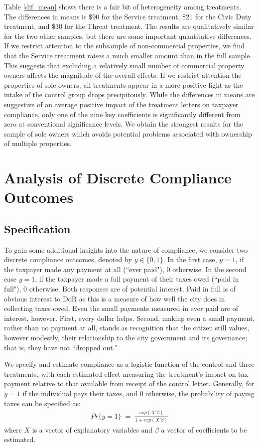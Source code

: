 \documentclass[12pt,titlepage]{article}
\begin{document}
Table \ref{dif_mean} shows there is a fair bit of heterogeneity among treatments. The differences in means 
is \$90 for the Service treatment, \$21 for the Civic Duty treatment, and \$30 for the 
Threat treatment. The results are qualitatively similar for the two other samples, but
there are some important quantitative differences. If we restrict attention to the subsample of
non-commercial properties, we find that the Service treatment raises a
much smaller amount than in the full sample. This suggests that excluding a relatively small number of 
commercial property owners affects the magnitude of the overall effects.  If we restrict
attention the properties of sole owners, all treatments appear in a
more positive light as the intake of the control group drops
precipitously. While the differences in means are suggestive of
an average positive impact of the treatment letters on taxpayer compliance, only one of the nine key coefficients is significantly different from zero at conventional significance levels. We obtain the strongest
results for the sample of sole owners which avoids potential problems associated
with ownership of multiple properties.

\section{Analysis of Discrete Compliance Outcomes}

\subsection{Specification}

To gain some additional insights into the nature of compliance, we 
consider two discrete compliance outcomes, denoted by $y \in \{0,1\}$. 
In the first case, $y= 1$, if the taxpayer made any payment at all (``ever paid"), 0
otherwise.  In the second case  $y = 1$, if the taxpayer made a full payment of their
taxes owed (``paid in full"), 0 otherwise.  Both responses are of
potential interest.  Paid in full is of obvious interest to DoR as
this is a measure of how well the city does in collecting taxes owed.
Even the small payments measured in ever paid are of interest,
however.  First, every dollar helps.  Second, making even a small
payment, rather than no payment at all, stands as recognition that the
citizen still values, however modestly, their relationship to the city
government and its governance; that is, they have not ``dropped out."

We specify and estimate compliance
as a logistic function of the control and three treatments, with each
estimated effect measuring the treatment's impact on tax payment
relative to that available from receipt of the control letter.
Generally, for $y = 1$ if the individual pays their taxes, and 0
otherwise, the probability of paying taxes can be specified as:
\begin{eqnarray*}
Pr \{ y=1 \} \; = \; \frac{exp(X' \beta)}{1 + exp(X' \beta)}
\end{eqnarray*}
where $X$ is a vector of explanatory variables and $\beta$ a vector of
coefficients to be estimated.
\end{document}
